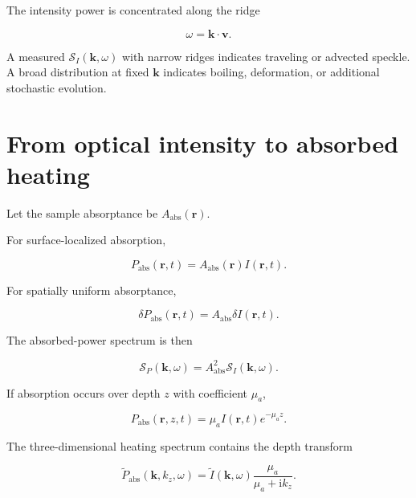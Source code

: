\documentclass[11pt]{article}
\newcommand{\ii}{\mathrm{i}}
\newcommand{\SII}{\mathcal{S}_{I}}
\newcommand{\kvec}{\mathbf{k}}
\newcommand{\rvec}{\mathbf{r}}
\begin{document}
The intensity power is concentrated along the ridge

\begin{equation}
\boxed{
    \omega=\kvec\cdot\mathbf{v}.
}
\end{equation}

A measured $\SII(\kvec,\omega)$ with narrow ridges indicates traveling or
advected speckle. A broad distribution at fixed $\kvec$ indicates boiling,
deformation, or additional stochastic evolution.

\section{From optical intensity to absorbed heating}

Let the sample absorptance be $A_{\mathrm{abs}}(\rvec)$.

For surface-localized absorption,

\begin{equation}
    P_{\mathrm{abs}}(\rvec,t)
    =
    A_{\mathrm{abs}}(\rvec)
    I(\rvec,t).
\end{equation}

For spatially uniform absorptance,

\begin{equation}
    \delta P_{\mathrm{abs}}(\rvec,t)
    =
    A_{\mathrm{abs}}
    \delta I(\rvec,t).
\end{equation}

The absorbed-power spectrum is then

\begin{equation}
    \mathcal{S}_{P}(\kvec,\omega)
    =
    A_{\mathrm{abs}}^2
    \SII(\kvec,\omega).
\end{equation}

If absorption occurs over depth $z$ with coefficient $\mu_a$,

\begin{equation}
    P_{\mathrm{abs}}(\rvec,z,t)
    =
    \mu_a I(\rvec,t)e^{-\mu_a z}.
\end{equation}

The three-dimensional heating spectrum contains the depth transform

\begin{equation}
    \widetilde{P}_{\mathrm{abs}}
    (\kvec,k_z,\omega)
    =
    \widetilde{I}(\kvec,\omega)
    \frac{\mu_a}{
        \mu_a+\ii k_z
    }.
\end{equation}
\end{document}
